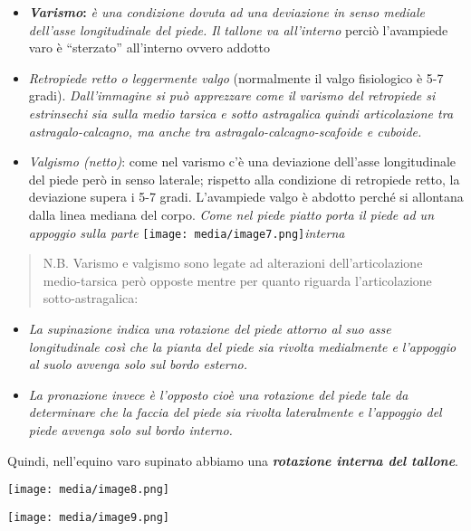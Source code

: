 \documentclass[]{article}
\begin{document}
\begin{itemize}
\item
  \textbf{\emph{Varismo}:} \emph{è una condizione dovuta ad una
  deviazione in senso mediale dell'asse longitudinale del piede. Il
  tallone va all'interno} perciò l'avampiede varo è ``sterzato''
  all'interno ovvero addotto
\item
  \emph{Retropiede retto o leggermente valgo} (normalmente il valgo
  fisiologico è 5-7 gradi). \emph{Dall'immagine si può apprezzare come
  il varismo del retropiede si estrinsechi sia sulla medio tarsica e
  sotto astragalica quindi articolazione tra astragalo-calcagno, ma
  anche tra astragalo-calcagno-scafoide e cuboide.}
\item
  \emph{Valgismo (netto)}: come nel varismo c'è una deviazione dell'asse
  longitudinale del piede però in senso laterale; rispetto alla
  condizione di retropiede retto, la deviazione supera i 5-7 gradi.
  L'avampiede valgo è abdotto perché si allontana dalla linea mediana
  del corpo. \emph{Come nel piede piatto porta il piede ad un appoggio
  sulla parte}
  \texttt{[image: media/image7.png]}\emph{interna}
\end{itemize}

\begin{quote}
N.B. Varismo e valgismo sono legate ad alterazioni dell'articolazione
medio-tarsica però opposte mentre per quanto riguarda l'articolazione
sotto-astragalica:
\end{quote}

\begin{itemize}
\item
  \emph{La \emph{supinazione} indica una rotazione del piede attorno al
  suo asse longitudinale così che la pianta del piede sia rivolta
  medialmente e l'appoggio al suolo avvenga solo sul bordo esterno. }
\item
  \emph{La \emph{pronazione} invece è l'opposto cioè una rotazione del
  piede tale da determinare che la faccia del piede sia rivolta
  lateralmente e l'appoggio del piede avvenga solo sul bordo interno. }
\end{itemize}

Quindi, nell'equino varo supinato abbiamo una \textbf{\emph{rotazione
interna del tallone}}.

\texttt{[image: media/image8.png]}

\texttt{[image: media/image9.png]}
\end{document}
